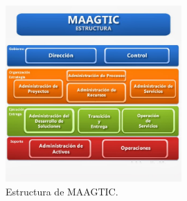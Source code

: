 	\begin{figure}[htbp!]
		\centering
			\includegraphics[width=0.6\textwidth]{images/antecedentes/MAAGTICSI.jpg}
		\caption{Estructura de MAAGTIC\cite{MAAGTICSIEstructura}.}
		\label{fig:MAAGTIC}
	\end{figure}
	
